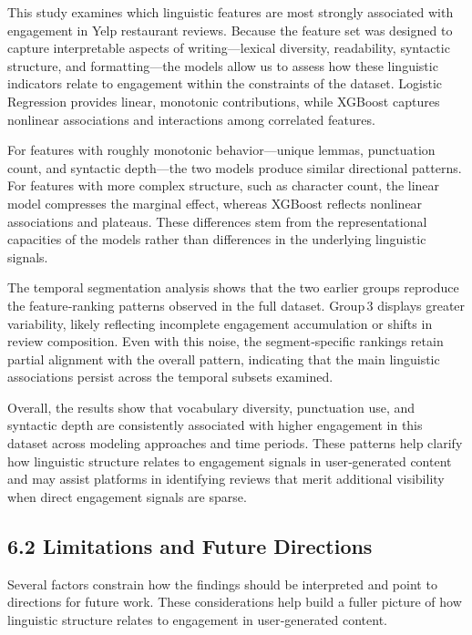 This study examines which linguistic features are most strongly
associated with engagement in Yelp restaurant reviews. Because the
feature set was designed to capture interpretable aspects of
writing---lexical diversity, readability, syntactic structure, and
formatting---the models allow us to assess how these linguistic
indicators relate to engagement within the constraints of the dataset.
Logistic Regression provides linear, monotonic contributions, while
XGBoost captures nonlinear associations and interactions among
correlated features.

For features with roughly monotonic behavior---unique lemmas,
punctuation count, and syntactic depth---the two models produce similar
directional patterns. For features with more complex structure, such as
character count, the linear model compresses the marginal effect,
whereas XGBoost reflects nonlinear associations and plateaus. These
differences stem from the representational capacities of the models
rather than differences in the underlying linguistic signals.

The temporal segmentation analysis shows that the two earlier groups
reproduce the feature‑ranking patterns observed in the full dataset.
Group\,3 displays greater variability, likely reflecting incomplete
engagement accumulation or shifts in review composition. Even with this
noise, the segment‑specific rankings retain partial alignment with the
overall pattern, indicating that the main linguistic associations
persist across the temporal subsets examined.

Overall, the results show that vocabulary diversity, punctuation use,
and syntactic depth are consistently associated with higher engagement
in this dataset across modeling approaches and time periods. These
patterns help clarify how linguistic structure relates to engagement
signals in user‑generated content and may assist platforms in
identifying reviews that merit additional visibility when direct
engagement signals are sparse.

\hypertarget{limitations-and-future-directions}{%
\subsection{6.2 Limitations and Future
Directions}\label{limitations-and-future-directions}}

Several factors constrain how the findings should be interpreted and
point to directions for future work. These considerations help build a
fuller picture of how linguistic structure relates to engagement in
user‑generated content.

